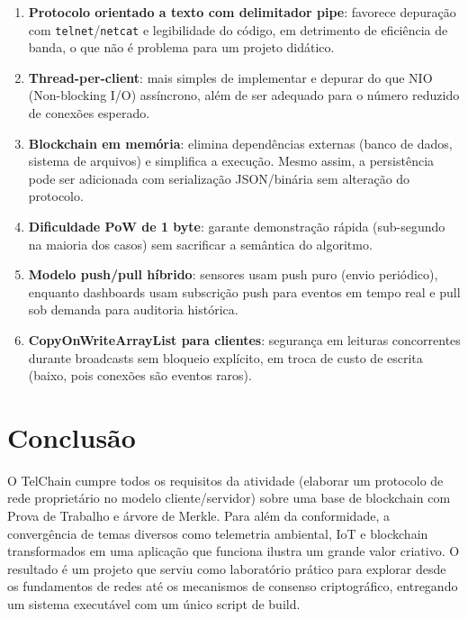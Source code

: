 \documentclass[12pt, a4paper]{article}
\begin{document}
\begin{enumerate}
  \item \textbf{Protocolo orientado a texto com delimitador pipe}: favorece depuração com
        \texttt{telnet}/\texttt{netcat} e legibilidade do código, em detrimento de eficiência
        de banda, o que não é problema para um projeto didático.

  \item \textbf{Thread-per-client}: mais simples de implementar e depurar do que NIO (Non-blocking I/O)
        assíncrono, além de ser adequado para o número reduzido de conexões esperado.

  \item \textbf{Blockchain em memória}: elimina dependências externas (banco de dados,
        sistema de arquivos) e simplifica a execução. Mesmo assim, a persistência pode ser adicionada
        com serialização JSON/binária sem alteração do protocolo.

  \item \textbf{Dificuldade PoW de 1 byte}: garante demonstração rápida (sub-segundo na
        maioria dos casos) sem sacrificar a semântica do algoritmo.

  \item \textbf{Modelo push/pull híbrido}: sensores usam push puro (envio periódico), enquanto dashboards usam subscrição push para eventos em tempo real e pull sob demanda para
        auditoria histórica.

  \item \textbf{CopyOnWriteArrayList para clientes}: segurança em leituras concorrentes
        durante broadcasts sem bloqueio explícito, em troca de custo de escrita (baixo,
        pois conexões são eventos raros).
\end{enumerate}


\section{Conclusão}
O TelChain cumpre todos os requisitos da atividade (elaborar um protocolo de rede proprietário no modelo cliente/servidor) sobre uma base de blockchain com Prova de Trabalho e árvore de Merkle. Para além da conformidade, a convergência de temas diversos como telemetria ambiental, IoT e blockchain transformados em uma aplicação que funciona ilustra um grande valor criativo. O resultado é um projeto que serviu como laboratório prático para explorar desde os fundamentos de redes até os mecanismos de consenso criptográfico, entregando um sistema executável com um único script de build.
\end{document}
